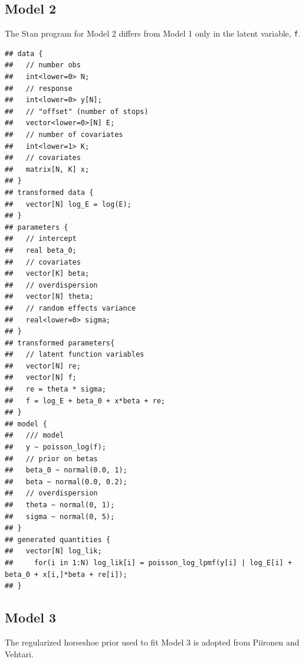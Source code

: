 \documentclass[]{article}
\begin{document}
\subsection{Model 2}\label{model-2-1}

The Stan program for Model 2 differs from Model 1 only in the latent
variable, \texttt{f}.

\begin{verbatim}
## data {
##   // number obs
##   int<lower=0> N;
##   // response
##   int<lower=0> y[N];       
##   // "offset" (number of stops)
##   vector<lower=0>[N] E;     
##   // number of covariates
##   int<lower=1> K;
##   // covariates
##   matrix[N, K] x;
## }
## transformed data {
##   vector[N] log_E = log(E);
## }
## parameters {
##   // intercept
##   real beta_0;      
##   // covariates
##   vector[K] beta;   
##   // overdispersion
##   vector[N] theta;
##   // random effects variance
##   real<lower=0> sigma;
## }
## transformed parameters{
##   // latent function variables
##   vector[N] re; 
##   vector[N] f;
##   re = theta * sigma; 
##   f = log_E + beta_0 + x*beta + re;
## }
## model {
##   /// model 
##   y ~ poisson_log(f); 
##   // prior on betas
##   beta_0 ~ normal(0.0, 1);
##   beta ~ normal(0.0, 0.2);
##   // overdispersion
##   theta ~ normal(0, 1);
##   sigma ~ normal(0, 5);
## }
## generated quantities {
##   vector[N] log_lik; 
##     for(i in 1:N) log_lik[i] = poisson_log_lpmf(y[i] | log_E[i] + beta_0 + x[i,]*beta + re[i]);
## }
\end{verbatim}

\subsection{Model 3}\label{model-3-1}

The regularized horseshoe prior used to fit Model 3 is adopted from
Piironen and Vehtari.
\end{document}
